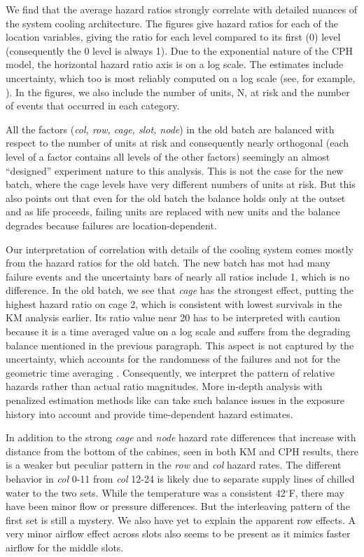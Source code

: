 We find that the average hazard ratios strongly correlate with
detailed nuances of the system cooling architecture.  The figures give
hazard ratios for each of the location variables, giving the ratio for
each level compared to its first (0) level (consequently the 0 level
is always 1). Due to the exponential nature of the CPH model, the
horizontal hazard ratio axis is on a log scale. The estimates include
uncertainty, which too is most reliably computed on a log scale (see,
for example, \cite{Ostrouchov88}). In the figures, we also include the
number of units, N, at risk and the number of events that occurred in
each category.

All the factors ({\em col, row, cage, slot, node}) in the old batch
are balanced with respect to the number of units at risk and
consequently nearly orthogonal (each level of a factor contains all
levels of the other factors) seemingly an almost ``designed''
experiment nature to this analysis. This is not the case for the new
batch, where the cage levels have very different numbers of units at
risk. But this also points out that even for the old batch the balance
holds only at the outset and as life proceeds, failing units are
replaced with new units and the balance degrades because failures are
location-dependent.

Our interpretation of correlation with details of the cooling system
comes mostly from the hazard ratios for the old batch. The new batch
has mot had many failure events and the uncertainty bars of nearly all
ratios include 1, which is no difference. In the old batch, we see
that {\em cage} has the strongest effect, putting the highest hazard
ratio on cage 2, which is consistent with lowest survivals in the KM
analysis earlier. Its ratio value near 20 has to be interpreted with
caution because it is a time averaged value on a log scale and suffers
from the degrading balance mentioned in the previous paragraph. This
aspect is not captured by the uncertainty, which accounts for the
randomness of the failures and not for the geometric time averaging
\cite{coxhazardinterpret}. Consequently, we interpret the pattern of
relative hazards rather than actual ratio magnitudes. More in-depth
analysis with penalized estimation methods like \cite{bender2019} can
take such balance issues in the exposure history into account and
provide time-dependent hazard estimates.

In addition to the strong {\em cage} and {\em node} hazard rate
differences that increase with distance from the bottom of the
cabines, seen in both KM and CPH results, there is a weaker but
peculiar pattern in the {\em row} and {\em col} hazard rates. The
different behavior in {\em col} 0-11 from {\em col} 12-24 is likely
due to separate supply lines of chilled water to the two sets. While
the temperature was a consistent 42$^\circ$F, there may have been
minor flow or pressure differences. But the interleaving pattern of
the first set is still a mystery. We also have yet to explain the
apparent row effects. A very minor airflow effect across slots also
seems to be present as it mimics faster airflow for the middle slots.

